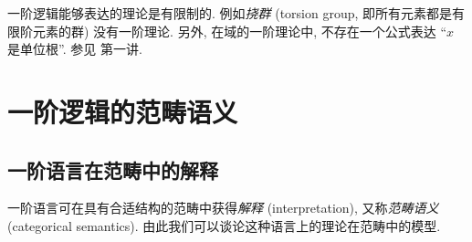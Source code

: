 

\begin{remark}
	{}
	一阶逻辑能够表达的理论是有限制的. 例如\emph{挠群} (torsion group, 即所有元素都是有限阶元素的群) 没有一阶理论.
	另外, 在域的一阶理论中, 不存在一个公式表达 ``$x$ 是单位根''. 参见 \cite{Lurie-Categorical-Logic} 第一讲.
\end{remark}

\section{一阶逻辑的范畴语义}

\subsection{一阶语言在范畴中的解释}

一阶语言可在具有合适结构的范畴中获得\emph{解释} (interpretation), 又称\emph{范畴语义} (categorical semantics).
由此我们可以谈论这种语言上的理论在范畴中的模型.

